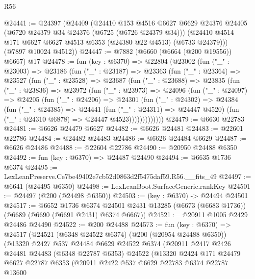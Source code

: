 \begin{lexlean}{R56}
\begin{coremodule}
@24441 := @24397
    (@24409
      (@24410
        @153
        @4516
        @6627
        @6629
        @24376
        @24405
        (@6720 @24379 @34 @24376 (@6725 (@6726 @24379 @34)))
        (@24410 @4514 @171 @6627 @6627 @4513 @6353 (@24380 @22 @4513) (@6733 @24379)))
      (@7897 @10024 @4512))
@24447 := @7882 (@6660 (@6664 (@200 @19556)) @6667) @17
@24478 := fun (key : @6370) =>
  @22804
    (@23002
      (fun ("_" : @23003) =>
      @23186
        (fun ("_" : @23187) =>
        @23363
          (fun ("_" : @23364) =>
          @23527
            (fun ("_" : @23528) =>
            @23687
              (fun ("_" : @23688) =>
              @23835
                (fun ("_" : @23836) =>
                @23972
                  (fun ("_" : @23973) =>
                  @24096
                    (fun ("_" : @24097) =>
                    @24205
                      (fun ("_" : @24206) =>
                      @24301
                        (fun ("_" : @24302) =>
                        @24384
                          (fun ("_" : @24385) =>
                          @24441
                            (fun ("_" : @24311) => @24447 @4520)
                            (fun ("_" : @24310 @6878) => @24447 @4523)))))))))))))
@24479 := @6630 @22783
@24481 := @6626 @24479 @6627
@24482 := @6626 @24481
@24483 := @22601 @22786
@24484 := @24482 @24483
@24486 := @6626 @24484 @6629
@24487 := @6626 @24486
@24488 := @22604 @22786
@24490 := @20950 @24488 @6350
@24492 := fun (key : @6370) => @24487 @24490
@24494 := @6635 @1736 @6374
@24495 := LexLeanPreserve.Ce7be49402e7cb52d0863d2f5475daf59.R56.__fits_49
@24497 := @6641 (@24495 @6350)
@24498 := LexLeanBoot.SurfaceGeneric.rankKey
@24501 := @24497 (@200 (@24498 @6350))
@24503 := (key : @6370) -> @24494 @24501
@24517 := @6652
    @1736
    @6374
    @24501
    @2431
    @13285
    (@6673 (@6683 @1736))
    (@6689 (@6690 (@6691 @2431) @6374 @6667))
@24521 := @20911 @1005 @2429 @24486 @24490
@24522 := @200 @24488
@24573 := fun (key : @6370) =>
  @24517
    (@24521
      (@6348 @24522 @6374)
      (@200 (@20954 @24488 @6350))
      (@13320
        @2427
        @537
        @24484
        @6629
        @24522
        @6374
        (@20911
          @2417
          @2426
          @24481
          @24483
          (@6348 @22787 @6353)
          @24522
          (@13320
            @2424
            @171
            @24479
            @6627
            @22787
            @6353
            (@20911
              @2422
              @537
              @6629
              @22783
              @6374
              @22787
              @13600

\end{coremodule}
\end{lexlean}
